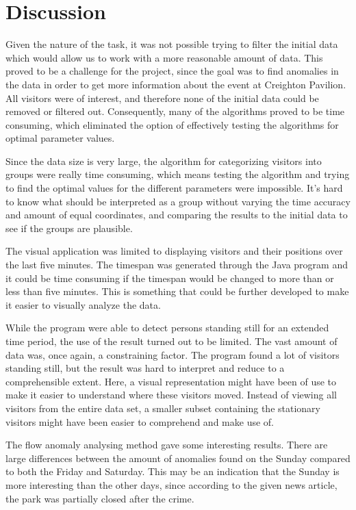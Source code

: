 \documentclass[journal]{vgtc}                %
\begin{document}
\section{Discussion}
Given the nature of the task, it was not possible trying to filter the initial data which would allow us to work with a more reasonable amount of data. This proved to be a challenge for the project, since the goal was to find anomalies in the data in order to get more information about the event at Creighton Pavilion. All visitors were of interest, and therefore none of the initial data could be removed or filtered out. Consequently, many of the algorithms proved to be time consuming, which eliminated the option of effectively testing the algorithms for optimal parameter values.

Since the data size is very large, the algorithm for categorizing visitors into groups were really time consuming, which means testing the algorithm and trying to find the optimal values for the different parameters were impossible. It's hard to know what should be interpreted as a group without varying the time accuracy and amount of equal coordinates, and comparing the results to the initial data to see if the groups are plausible.

The visual application was limited to displaying visitors and their positions over the last five minutes. The timespan was generated through the Java program and it could be time consuming if the timespan would be changed to more than or less than five minutes. This is something that could be further developed to make it easier to visually analyze the data.

While the program were able to detect persons standing still for an extended time period, the use of the result turned out to be limited. The vast amount of data was, once again, a constraining factor. The program found a lot of visitors standing still, but the result was hard to interpret and reduce to a comprehensible extent. Here, a visual representation might have been of use to make it easier to understand where these visitors moved. Instead of viewing all visitors from the entire data set, a smaller subset containing the stationary visitors might have been easier to comprehend and make use of.

The flow anomaly analysing method gave some interesting results. There are large differences between the amount of anomalies found on the Sunday compared to both the Friday and Saturday. This may be an indication that the Sunday is more interesting than the other days, since according to the given news article, the park was partially closed after the crime.
\end{document}
